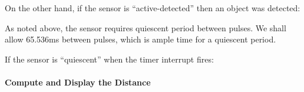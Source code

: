 On the other hand, if the sensor is ``active-detected'' then an object was detected:
\begin{description}
\end{description}

As noted above, the sensor requires quiescent period between pulses.
We shall allow 65.536ms between pulses, which is ample time for a quiescent period.

If the sensor is ``quiescent'' when the timer interrupt fires:
\begin{description}
\end{description}


\paragraph{Compute and Display the Distance}

